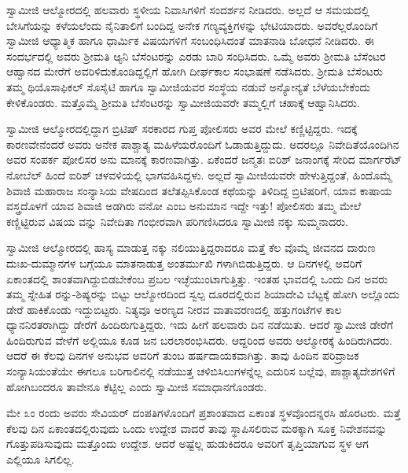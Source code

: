 ಸ್ವಾಮೀಜಿ ಆಲ್ಮೋರದಲ್ಲಿ ಹಲವಾರು ಸ್ಥಳೀಯ ನಿವಾಸಿಗಳಿಗೆ ಸಂದರ್ಶನ ನೀಡಿದರು. ಅಲ್ಲದೆ ಆ ಸಮಯದಲ್ಲಿ ಬೇಸಿಗೆಯನ್ನು ಕಳೆಯಲೆಂದು ನೈನಿತಾಲಿಗೆ ಬಂದಿದ್ದ ಅನೇಕ ಗಣ್ಯವ್ಯಕ್ತಿಗಳನ್ನು ಭೇಟಿಯಾದರು. ಅವರೆಲ್ಲರೊಂದಿಗೆ ಸ್ವಾಮೀಜಿ ಆಧ್ಯಾತ್ಮಿಕ ಹಾಗೂ ಧಾರ್ಮಿಕ ವಿಷಯಗಳಿಗೆ ಸಂಬಂಧಿಸಿದಂತೆ ಮಾತನಾಡಿ ಬೋಧನೆ ನೀಡಿದರು. ಈ ಸಂದರ್ಭದಲ್ಲಿ ಅವರು ಶ್ರೀಮತಿ ಆ್ಯನಿ ಬೆಸೆಂಟರನ್ನು ಎರಡು ಬಾರಿ ಸಂಧಿಸಿದರು. ಒಮ್ಮೆ ಅವರು ಶ್ರೀಮತಿ ಬೆಸೆಂಟರ ಆಹ್ವಾನದ ಮೇರೆಗೆ ಅವರಿಳಿದುಕೊಂಡಿದ್ದಲ್ಲಿಗೆ ಹೋಗಿ ದೀರ್ಘಕಾಲ ಸಂಭಾಷಣೆ ನಡೆಸಿದರು. ಶ್ರೀಮತಿ ಬೆಸೆಂಟರು ತಮ್ಮ ಥಿಯೊಸಾಫಿಕಲ್ ಸೊಸೈಟಿ ಹಾಗೂ ಸ್ವಾಮೀಜಿಯವರ ಸಂಸ್ಥೆಯ ನಡುವೆ ಅನ್ಯೋನ್ಯತೆ ಬೆಳೆಯಬೇಕೆಂದು ಕೇಳಿಕೊಂಡರು. ಮತ್ತೊಮ್ಮೆ ಶ್ರೀಮತಿ ಬೆಸೆಂಟರನ್ನು ಸ್ವಾಮೀಜಿಯವರೇ ತಮ್ಮಲ್ಲಿಗೆ ಚಹಾಕ್ಕೆ ಆಹ್ವಾನಿಸಿದರು.

ಸ್ವಾಮೀಜಿ ಆಲ್ಮೋರದಲ್ಲಿದ್ದಾಗ ಬ್ರಿಟಿಷ್ ಸರಕಾರದ ಗುಪ್ತ ಪೋಲಿಸರು ಅವರ ಮೇಲೆ ಕಣ್ಣಿಟ್ಟಿದ್ದರು. ಇದಕ್ಕೆ ಕಾರಣವೇನೆಂದರೆ ಅವರು ಅನೇಕ ಪಾಶ್ಚಾತ್ಯ ಮಹಿಳೆಯರೊಂದಿಗೆ ಓಡಾಡುತ್ತಿದ್ದುದು. ಅದರಲ್ಲೂ ನಿವೇದಿತೆಯೊಂದಿಗಿನ ಅವರ ಸಂಪರ್ಕ ಪೋಲಿಸರ ಅನು ಮಾನಕ್ಕೆ ಕಾರಣವಾಗಿತ್ತು. ಏಕೆಂದರೆ ಜನ್ಮತಃ ಐರಿಶ್ ಜನಾಂಗಕ್ಕೆ ಸೇರಿದ ಮಾರ್ಗರೆಟ್ ನೋಬೆಲ್ ಹಿಂದೆ ಐರಿಶ್ ಚಳವಳಿಯಲ್ಲಿ ಭಾಗವಹಿಸಿದ್ದಳು. ಅಲ್ಲದೆ ಸ್ವಾಮೀಜಿಯವರೇ ಹೇಳುತ್ತಿದ್ದಂತೆ, ಹಿಂದೊಮ್ಮೆ ಶಿವಾಜಿ ಮಹಾರಾಜ ಸಂನ್ಯಾಸಿಯ ವೇಷದಿಂದ ತಲೆತಪ್ಪಿಸಿಕೊಂಡ ಕಥೆಯನ್ನು ತಿಳಿದಿದ್ದ ಬ್ರಿಟಿಷರಿಗೆ, ಯಾವ ಕಾಷಾಯ ವಸ್ತ್ರದೊಳಗೆ ಯಾವ ಶಿವಾಜಿ ಅಡಗಿರು ವನೋ ಎಂಬ ಅನುಮಾನ ಇದ್ದೇ ಇತ್ತು! ಪೋಲಿಸರು ತಮ್ಮ ಮೇಲೆ ಕಣ್ಣಿಟ್ಟಿರುವ ವಿಷಯ ವನ್ನು ನಿವೇದಿತಾ ಗಂಭೀರವಾಗಿ ಪರಿಗಣಿಸಿದರೂ ಸ್ವಾಮೀಜಿ ನಕ್ಕು ಸುಮ್ಮನಾದರು.

ಸ್ವಾಮೀಜಿ ಆಲ್ಮೋರದಲ್ಲಿ ಹಾಸ್ಯ ಮಾಡುತ್ತ ನಕ್ಕು ನಲಿಯುತ್ತಿದ್ದರಾದರೂ ಮತ್ತೆ ಕೆಲ ವೊಮ್ಮೆ ಜೀವನದ ದಾರುಣ ದುಃಖ-ದುಮ್ಮಾನಗಳ ಬಗ್ಗೆಯೂ ಮಾತನಾಡುತ್ತ ಅಂತರ್ಮುಖಿ ಗಳಾಗಿಬಿಡುತ್ತಿದ್ದರು. ಆ ದಿನಗಳಲ್ಲಿ ಅವರಿಗೆ ಏಕಾಂತದಲ್ಲಿ ಶಾಂತವಾಗಿದ್ದುಬಿಡಬೇಕೆಂಬ ಪ್ರಬಲ ಇಚ್ಛೆಯುಂಟಾಗುತ್ತಿತ್ತು. ಇಂತಹ ಭಾವದಲ್ಲಿ ಒಂದು ದಿನ ಅವರು ತಮ್ಮ ಸ್ನೇಹಿತ ರನ್ನು-ಶಿಷ್ಯರನ್ನು ಬಿಟ್ಟು ಆಲ್ಮೋರದಿಂದ ಸ್ವಲ್ಪ ದೂರದಲ್ಲಿರುವ ಶಿಯಾದೇವಿ ಬೆಟ್ಟಕ್ಕೆ ಹೋಗಿ ಅಲ್ಲೊಂದು ಡೇರೆ ಹಾಕಿಕೊಂಡು ಇದ್ದುಬಿಟ್ಟರು. ನಿತ್ಯವೂ ಅರಣ್ಯದ ನೀರವ ವಾತಾವರಣದಲ್ಲಿ ಹತ್ತುಗಂಟೆಗಳ ಕಾಲ ಧ್ಯಾನನಿರತರಾಗಿದ್ದು ಡೇರೆಗೆ ಹಿಂದಿರುಗುತ್ತಿದ್ದರು. ಇದು ಹೀಗೆ ಹಲವಾರು ದಿನ ನಡೆಯಿತು. ಆದರೆ ಸ್ವಾಮೀಜಿ ಡೇರೆಗೆ ಹಿಂದಿರುಗುವ ವೇಳೆಗೆ ಅಲ್ಲಿಯೂ ಕೂಡ ಜನ ಬರಲಾರಂಭಿಸಿದರು. ಆದ್ದರಿಂದ ಅವರು ಆಲ್ಮೋರಕ್ಕೆ ಹಿಂದಿರುಗಿದರು. ಆದರೆ ಈ ಕೆಲವು ದಿನಗಳ ಅನುಭವ ಅವರಿಗೆ ತುಂಬ ಹರ್ಷದಾಯಕವಾಗಿತ್ತು. ತಾವು ಹಿಂದಿನ ಪರಿವ್ರಾಜಕ ಸಂನ್ಯಾಸಿಯಂತೆಯೇ ಈಗಲೂ ಬರಿಗಾಲಿನಲ್ಲಿ ನಡೆಯುತ್ತ ಚಳಿಬಿಸಿಲುಗಳನ್ನೆಲ್ಲ ಎದುರಿಸ ಬಲ್ಲೆವು, ಪಾಶ್ಚಾತ್ಯದೇಶಗಳಿಗೆ ಹೋಗಿಬಂದರೂ ತಾವೇನೂ ಕೆಟ್ಟಿಲ್ಲ ಎಂದು ಸ್ವಾಮೀಜಿ ಸಮಾಧಾನಗೊಂಡರು.

ಮೇ ೩ಂ ರಂದು ಅವರು ಸೇವಿಯರ್ ದಂಪತಿಗಳೊಂದಿಗೆ ಪ್ರಶಾಂತವಾದ ಏಕಾಂತ ಸ್ಥಳವೊಂದನ್ನರಸಿ ಹೊರಟರು. ಮತ್ತೆ ಕೆಲವು ದಿನ ಏಕಾಂತದಲ್ಲಿರುವುದು ಒಂದು ಉದ್ದೇಶ ವಾದರೆ ತಾವು ಸ್ಥಾಪಿಸಲಿರುವ ಮಠಕ್ಕಾಗಿ ಸೂಕ್ತ ನಿವೇಶನವನ್ನು ಗೊತ್ತುಪಡಿಸುವುದು ಮತ್ತೊಂದು ಉದ್ದೇಶ. ಆದರೆ ಅಷ್ಟೆಲ್ಲ ಹುಡುಕಿದರೂ ಅವರಿಗೆ ತೃಪ್ತಿಯಾಗುವ ಸ್ಥಳ ಆಗ ಎಲ್ಲಿಯೂ ಸಿಗಲಿಲ್ಲ.

